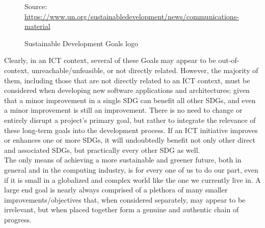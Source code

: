 \begin{figure} %
  \centering
  \def\stackalignment{r} %
  {\scriptsize \parbox[t]{\linewidth}{ Source: \url{https://www.un.org/sustainabledevelopment/news/communications-material}} }
  \caption{Sustainable Development Goals logo}
\end{figure}

Clearly, in an ICT context, several of these Goals may appear to be out-of-context,
unreachable/unfeasible, or not directly related. However, the majority of them, including
those that are not directly related to an ICT context, must be considered when
developing new software applications and architectures; given that a minor improvement
in a single SDG can benefit all other SDGs, and even a minor improvement is
still an improvement. There is no need to change or entirely disrupt a project's
primary goal, but rather to integrate the relevance of these long-term goals
into the development process. If an ICT initiative improves or enhances one or more
SDGs, it will undoubtedly benefit not only other direct and associated SDGs, but
practically every other SDG as well. \\ %
The only means of achieving a more sustainable and greener future, both in
general and in the computing industry, is for every one of us to do our part,
even if it is small in a globalized and complex world like the one we currently
live in. A large end goal is nearly always comprised of a plethora of many smaller
improvements/objectives that, when considered separately, may appear to be irrelevant,
but when placed together form a genuine and authentic chain of progress.

